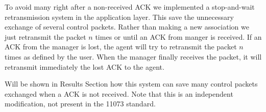 To avoid many right after a non-received ACK we implemented a stop-and-wait retransmission system in the application layer. This save the unnecessary exchange of several control packets. Rather than making a new association we just retransmit the packet $n$ times or until an ACK from manger is received.
If an ACK from the manager is lost, the agent will try to retransmit the packet $n$ times as defined by the user. When the manager finally receives the packet, it will retransmit immediately the lost ACK to the agent.

Will be shown in Results Section how this system can save many control packets exchanged when a ACK is not received. Note that this is an independent modification, not present in the 11073 standard. 
